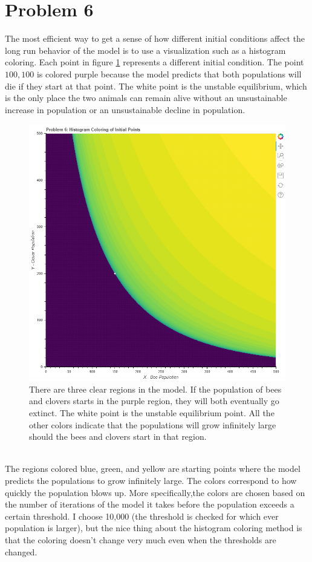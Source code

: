 \documentclass[12pt,a4paper,titlepage]{report}
\begin{document}
	\section*{Problem 6}
		The most efficient way to get a sense of how different initial conditions affect the long run behavior of the model is to use a visualization such as a histogram coloring. Each point in figure \ref{fig:p6} represents a different initial condition. The point \(100, 100\) is colored purple because the model predicts that both populations will die if they start at that point. The white point is the unstable equilibrium, which is the only place the two animals can remain alive without an unsustainable increase in population or an unsustainable decline in population. 
		\begin{figure}[htbp]
			\centerline{\includegraphics[scale=.5]{charts/problem6_chart.png}}
			\caption{There are three clear regions in the model. If the population of bees and clovers starts in the purple region, they will both eventually go extinct. The white point is the unstable equilibrium point. All the other colors indicate that the populations will grow infinitely large should the bees and clovers start in that region.}
			\label{fig:p6}
		\end{figure}\\
		The regions colored blue, green, and yellow are starting points where the model predicts the populations to grow infinitely large. The colors correspond to how quickly the population blows up. More specifically,the colors are chosen based on the number of iterations of the model it takes before the population exceeds a certain threshold. I choose 10,000 (the threshold is checked for which ever population is larger), but the nice thing about the histogram coloring method is that the coloring doesn't change very much even when the thresholds are changed. 
		
\end{document}
